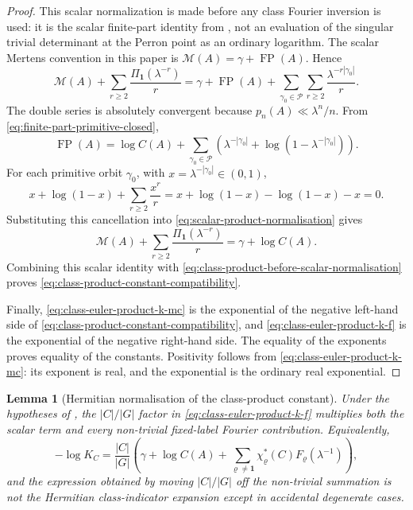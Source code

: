 \documentclass[11pt,a4paper]{amsart}
\theoremstyle{plain}
\newtheorem{lemma}[theorem]{Lemma}
\theoremstyle{definition}
\theoremstyle{remark}
\DeclareMathOperator{\FP}{FP}
\newcommand{\cP}{\mathcal P}
\begin{document}
\begin{proof}
  This scalar normalization is made before any class Fourier inversion is
  used: it is the scalar finite-part identity from ,
  not an evaluation of the singular trivial determinant at the Perron
  point as an ordinary logarithm.
  The scalar Mertens convention in this paper is
  \(\mathcal M(A)=\gamma+\FP(A)\). Hence
  \begin{equation}\label{eq:scalar-product-normalisation}
    \mathcal M(A)+\sum_{r\ge2}\frac{\Pi_{\mathbf1}(\lambda^{-r})}{r}
    =
    \gamma+\FP(A)+
    \sum_{\gamma_0\in\cP}\sum_{r\ge2}
      \frac{\lambda^{-r|\gamma_0|}}{r}.
  \end{equation}
  The double series is absolutely convergent because
  \(p_n(A)\ll\lambda^n/n\). From
  \eqref{eq:finite-part-primitive-closed},
  \[
    \FP(A)
    =
    \log C(A)+
    \sum_{\gamma_0\in\cP}
      \left(
        \lambda^{-|\gamma_0|}
        +\log(1-\lambda^{-|\gamma_0|})
      \right).
  \]
  For each primitive orbit \(\gamma_0\), with
  \(x=\lambda^{-|\gamma_0|}\in(0,1)\),
  \[
    x+\log(1-x)+\sum_{r\ge2}\frac{x^r}{r}
    =x+\log(1-x)-\log(1-x)-x=0.
  \]
  Substituting this cancellation into
  \eqref{eq:scalar-product-normalisation} gives
  \[
    \mathcal M(A)+\sum_{r\ge2}\frac{\Pi_{\mathbf1}(\lambda^{-r})}{r}
    =\gamma+\log C(A).
  \]
  Combining this scalar identity with
  \eqref{eq:class-product-before-scalar-normalisation} proves
  \eqref{eq:class-product-constant-compatibility}.

  Finally, \eqref{eq:class-euler-product-k-mc} is the exponential of the
  negative left-hand side of
  \eqref{eq:class-product-constant-compatibility}, and
  \eqref{eq:class-euler-product-k-f} is the exponential of the negative
  right-hand side. The equality of the exponents proves equality of the
  constants. Positivity follows from
  \eqref{eq:class-euler-product-k-mc}: its exponent is real, and the
  exponential is the ordinary real exponential.
\end{proof}

\begin{lemma}[Hermitian normalisation of the class-product constant]
  \label{lem:class-product-hermitian-normalisation}
  Under the hypotheses of , the
  \(|C|/|G|\) factor in \eqref{eq:class-euler-product-k-f} multiplies both
  the scalar term and every non-trivial fixed-label Fourier contribution.
  Equivalently,
  \begin{equation}\label{eq:class-product-normalisation-identity}
    -\log K_C
    =
    \frac{|C|}{|G|}
    \left(
      \gamma+\log C(A)
      +\sum_{\varrho\neq\mathbf1}
        \chi_\varrho^\ast(C)F_\varrho(\lambda^{-1})
    \right),
  \end{equation}
  and the expression obtained by moving \(|C|/|G|\) off the non-trivial
  summation is not the Hermitian class-indicator expansion except in
  accidental degenerate cases.
\end{lemma}
\end{document}
